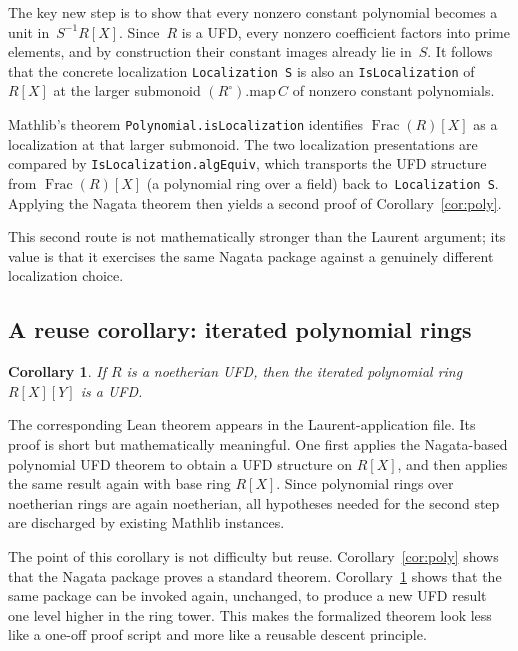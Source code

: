 \documentclass[11pt]{article}
\theoremstyle{plain}
\newtheorem{corollary}[theorem]{Corollary}
\theoremstyle{definition}
\theoremstyle{remark}
\newcommand{\li}[1]{\texorpdfstring{\texttt{#1}}{#1}}
\begin{document}
The key new step is to show that every nonzero constant polynomial becomes a
unit in~$S^{-1}R[X]$.  Since~$R$ is a UFD, every nonzero coefficient factors
into prime elements, and by construction their constant images already lie
in~$S$.  It follows that the concrete localization \li{Localization\,S} is also
an \li{IsLocalization} of~$R[X]$ at the larger submonoid $(R^\circ).\mathrm{map}\,C$
of nonzero constant polynomials.

Mathlib's theorem \li{Polynomial.isLocalization} identifies
$\operatorname{Frac}(R)[X]$ as a localization at that larger submonoid.  The
two localization presentations are compared by \li{IsLocalization.algEquiv},
which transports the UFD structure from $\operatorname{Frac}(R)[X]$ (a
polynomial ring over a field) back to~\li{Localization\,S}.  Applying the
Nagata theorem then yields a second proof of Corollary~\ref{cor:poly}.

This second route is not mathematically stronger than the Laurent argument; its
value is that it exercises the same Nagata package against a genuinely
different localization choice.

\subsection{A reuse corollary: iterated polynomial rings}

\begin{corollary}\label{cor:iterpoly}
If $R$ is a noetherian UFD, then the iterated polynomial ring $R[X][Y]$ is a
UFD.
\end{corollary}

\noindent
The corresponding Lean theorem appears in the Laurent-application file.  Its
proof is short but mathematically
meaningful.  One first applies the Nagata-based polynomial UFD theorem to
obtain a UFD structure on $R[X]$, and then applies the same result again with
base ring $R[X]$.  Since polynomial rings over noetherian rings are again
noetherian, all hypotheses needed for the second step are discharged by
existing Mathlib instances.

The point of this corollary is not difficulty but reuse.  Corollary~\ref{cor:poly}
shows that the Nagata package proves a standard theorem.  Corollary~\ref{cor:iterpoly}
shows that the same package can be invoked again, unchanged, to produce a new
UFD result one level higher in the ring tower.  This makes the formalized
theorem look less like a one-off proof script and more like a reusable
descent principle.
\end{document}

